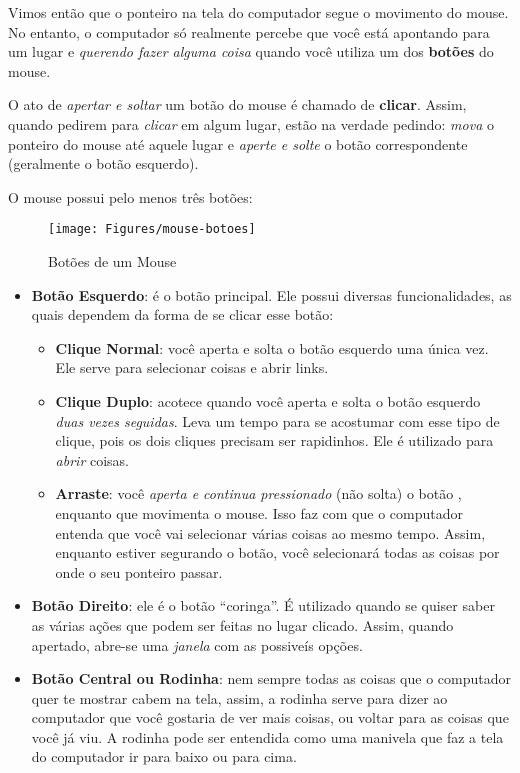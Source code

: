 \documentclass[hidelinks,12pt]{article}
\begin{document}
Vimos então que o ponteiro na tela do computador segue o movimento do mouse. No entanto, o computador só realmente percebe que você está apontando para um lugar e \emph{querendo fazer alguma coisa} quando você utiliza um dos \textbf{botões} do mouse.

O ato de \emph{apertar e soltar} um botão do mouse é chamado de \textbf{clicar}. Assim, quando pedirem para \emph{clicar} em algum lugar, estão na verdade pedindo: \emph{mova} o ponteiro do mouse até aquele lugar e \emph{aperte e solte} o botão correspondente (geralmente o botão esquerdo).

O mouse possui pelo menos três botões:

\begin{figure}[!h]
	\centering
	\texttt{[image: Figures/mouse-botoes]}
	\caption{Botões de um Mouse}
	\label{fig:mouse-botoes}
\end{figure}

\begin{itemize}
	\item \textbf{Botão Esquerdo}: é o botão principal. Ele possui diversas funcionalidades, as quais dependem da forma de se clicar esse botão:
	
	\begin{itemize}
	    \item \textbf{Clique Normal}: você aperta e solta o botão esquerdo uma única vez. Ele serve para selecionar coisas e abrir links.
	    
	    \item \textbf{Clique Duplo}: acotece quando você aperta e solta o botão esquerdo \emph{duas vezes seguidas}. Leva um tempo para se acostumar com esse tipo de clique, pois os dois cliques precisam ser rapidinhos. Ele é utilizado para \emph{abrir} coisas.
	    
	    \item \textbf{Arraste}: você \emph{aperta e continua pressionado} (não solta) o botão , enquanto que movimenta o mouse. Isso faz com que o computador entenda que você vai selecionar várias coisas ao mesmo tempo. Assim, enquanto estiver segurando o botão, você selecionará todas as coisas por onde o seu ponteiro passar.
	\end{itemize}
	
	\item \textbf{Botão Direito}: ele é o botão ``coringa''. É utilizado quando se quiser saber as várias ações que podem ser feitas no lugar clicado. Assim, quando apertado, abre-se uma \emph{janela} com as possiveís opções.
	
	\item \textbf{Botão Central ou Rodinha}: nem sempre todas as coisas que o computador quer te mostrar cabem na tela, assim, a rodinha serve para dizer ao computador que você gostaria de ver mais coisas, ou voltar para as coisas que você já viu. A rodinha pode ser entendida como uma manivela que faz a tela do computador ir para baixo ou para cima.
\end{itemize}
\end{document}
